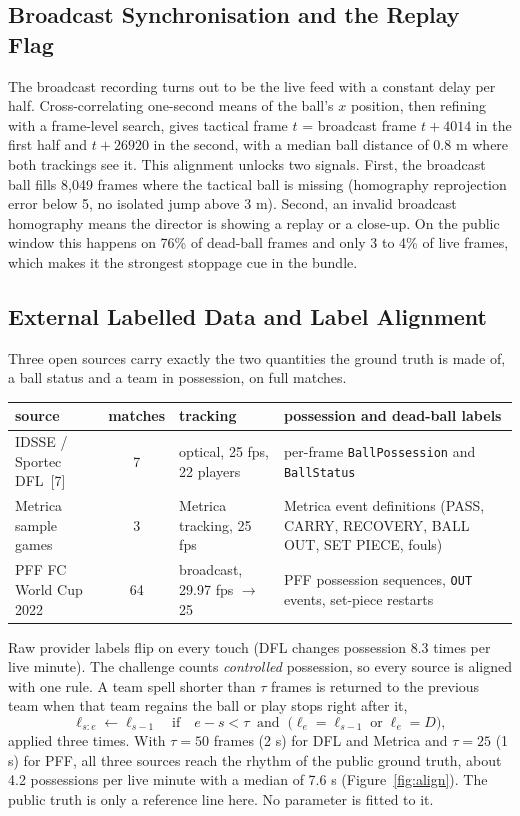 \documentclass[10pt]{article}
\begin{document}
\subsection*{Broadcast Synchronisation and the Replay Flag}
The broadcast recording turns out to be the live feed with a constant delay per half. Cross-correlating one-second means of the ball's $x$ position, then refining with a frame-level search, gives tactical frame $t$ = broadcast frame $t + 4014$ in the first half and $t + 26920$ in the second, with a median ball distance of 0.8 m where both trackings see it. This alignment unlocks two signals. First, the broadcast ball fills 8{,}049 frames where the tactical ball is missing (homography reprojection error below 5, no isolated jump above 3 m). Second, an invalid broadcast homography means the director is showing a replay or a close-up. On the public window this happens on 76\% of dead-ball frames and only 3 to 4\% of live frames, which makes it the strongest stoppage cue in the bundle.

\subsection*{External Labelled Data and Label Alignment}
Three open sources carry exactly the two quantities the ground truth is made of, a ball status and a team in possession, on full matches.

\begin{table}[H]
\centering\small
\begin{tabularx}{\linewidth}{@{}l c l X@{}}
\toprule
source & matches & tracking & possession and dead-ball labels \\
\midrule
IDSSE / Sportec DFL~[7] & 7 & optical, 25 fps, 22 players & per-frame \texttt{BallPossession} and \texttt{BallStatus} \\
Metrica sample games & 3 & Metrica tracking, 25 fps & Metrica event definitions (PASS, CARRY, RECOVERY, BALL OUT, SET PIECE, fouls) \\
PFF FC World Cup 2022 & 64 & broadcast, 29.97 fps $\to$ 25 & PFF possession sequences, \texttt{OUT} events, set-piece restarts \\
\bottomrule
\end{tabularx}
\end{table}

Raw provider labels flip on every touch (DFL changes possession 8.3 times per live minute). The challenge counts \emph{controlled} possession, so every source is aligned with one rule. A team spell shorter than $\tau$ frames is returned to the previous team when that team regains the ball or play stops right after it,
\begin{equation}
\ell_{s:e} \leftarrow \ell_{s-1} \quad \text{if} \quad e - s < \tau \;\; \text{and} \;\; \big(\ell_{e} = \ell_{s-1} \;\text{or}\; \ell_{e} = D\big),
\end{equation}
applied three times. With $\tau = 50$ frames (2 s) for DFL and Metrica and $\tau = 25$ (1 s) for PFF, all three sources reach the rhythm of the public ground truth, about 4.2 possessions per live minute with a median of 7.6 s (Figure~\ref{fig:align}). The public truth is only a reference line here. No parameter is fitted to it.
\end{document}
